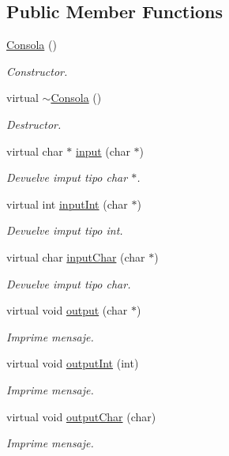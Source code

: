 \subsection*{Public Member Functions}
\begin{DoxyCompactItemize}
\item 
\hyperlink{class_consola_a3ff916630eb67f128d522b870ae6c439}{Consola} ()\hypertarget{class_consola_a3ff916630eb67f128d522b870ae6c439}{}\label{class_consola_a3ff916630eb67f128d522b870ae6c439}

\begin{DoxyCompactList}\small\item\em Constructor. \end{DoxyCompactList}\item 
virtual \hyperlink{class_consola_a6fa096bc9af905959000b7b33a564af9}{$\sim$\+Consola} ()\hypertarget{class_consola_a6fa096bc9af905959000b7b33a564af9}{}\label{class_consola_a6fa096bc9af905959000b7b33a564af9}

\begin{DoxyCompactList}\small\item\em Destructor. \end{DoxyCompactList}\item 
virtual char $\ast$ \hyperlink{class_consola_a7841aab76efc1455db0f70150da9ac9f}{input} (char $\ast$)
\begin{DoxyCompactList}\small\item\em Devuelve imput tipo char $\ast$. \end{DoxyCompactList}\item 
virtual int \hyperlink{class_consola_a550878e0eafe9d8aa606d43b80a7c93f}{input\+Int} (char $\ast$)
\begin{DoxyCompactList}\small\item\em Devuelve imput tipo int. \end{DoxyCompactList}\item 
virtual char \hyperlink{class_consola_a1645e6ac0a93033bcd126f71c2092a94}{input\+Char} (char $\ast$)
\begin{DoxyCompactList}\small\item\em Devuelve imput tipo char. \end{DoxyCompactList}\item 
virtual void \hyperlink{class_consola_a7655c767964f53f3ff18bf2c184b1ec3}{output} (char $\ast$)
\begin{DoxyCompactList}\small\item\em Imprime mensaje. \end{DoxyCompactList}\item 
virtual void \hyperlink{class_consola_ab8cde9154436a0d47d6690fb1bc69f5c}{output\+Int} (int)
\begin{DoxyCompactList}\small\item\em Imprime mensaje. \end{DoxyCompactList}\item 
virtual void \hyperlink{class_consola_a455f9dfe7855f3107373fc03d1ee75e2}{output\+Char} (char)
\begin{DoxyCompactList}\small\item\em Imprime mensaje. \end{DoxyCompactList}\end{DoxyCompactItemize}


